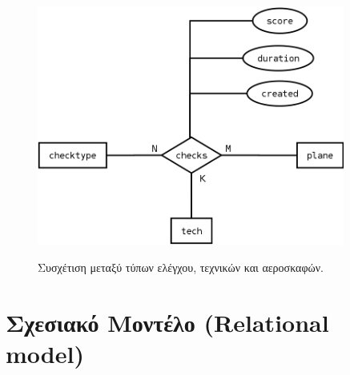 \documentclass[a4paper]{article}
\begin{document}
\begin{figure}[h]
\centering
\includegraphics[width=0.9\textwidth]{../../ER_model/aviation_relations_2.png}\\
\caption{Συσχέτιση μεταξύ τύπων ελέγχου, τεχνικών και αεροσκαφών.}
\end{figure}
\pagebreak

\section{Σχεσιακό Μοντέλο  (Relational model)}
\end{document}
